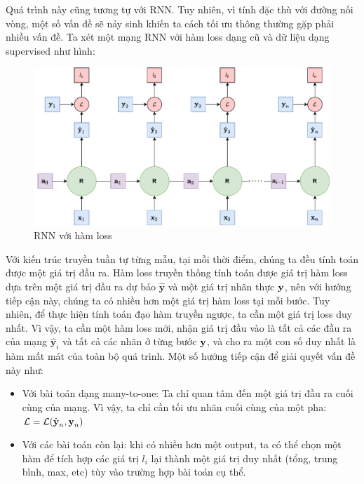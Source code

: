 Quá trình này cũng tương tự với RNN. Tuy nhiên, vì tính đặc thù với đường nối vòng, một số vấn đề sẽ nảy sinh khiến ta cách tối ưu thông thường gặp phải nhiều vấn đề. Ta xét một mạng RNN với hàm loss dạng cũ và dữ liệu dạng supervised như hình:
\begin{figure}[!h]
    \centering
    \includegraphics[width=\textwidth,height=\textheight,keepaspectratio]{books/artificial-neural-network/chapter06/figure-sec2345/rnn_with_loss.pdf}
    \caption{RNN với hàm loss}
\end{figure}

Với kiến trúc truyền tuần tự từng mẫu, tại mỗi thời điểm, chúng ta đều tính toán được một giá trị đầu ra. Hàm loss truyền thống tính toán được giá trị hàm loss dựa trên một giá trị đầu ra dự báo $\hat{\textbf{y}}$ và một giá trị nhãn thực $\textbf y$, nên với hướng tiếp cận này, chúng ta có nhiều hơn một giá trị hàm loss tại mỗi bước. Tuy nhiên, để thực hiện tính toán đạo hàm truyền ngược, ta cần một giá trị loss duy nhất. Vì vậy, ta cần một hàm loss mới, nhận giá trị đầu vào là tất cả các đầu ra của mạng $\hat{\textbf{y}}_i$ và tất cả các nhãn ở từng bước $\textbf y$, và cho ra một con số duy nhất là hàm mất mát của toàn bộ quá trình. Một số hướng tiếp cận để giải quyết vấn đề này như:
\begin{itemize}
    \item Với bài toán dạng many-to-one: Ta chỉ quan tâm đến một giá trị đầu ra cuối cùng của mạng. Vì vậy, ta chỉ cần tối ưu nhãn cuối cùng của một pha: $\mathcal{L} = \mathcal{L}(\hat{\textbf{y}}_n,\textbf y_n)$
    \item Với các bài toán còn lại: khi có nhiều hơn một output, ta có thể chọn một hàm để tích hợp các giá trị $l_i$ lại thành một giá trị duy nhất (tổng, trung bình, max, etc) tùy vào trường hợp bài toán cụ thể.
\end{itemize}

